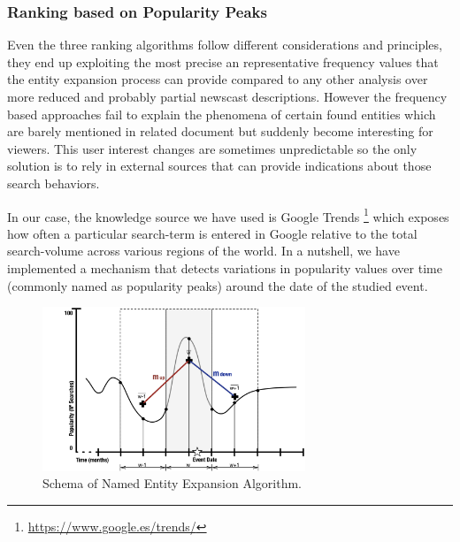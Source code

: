 \documentclass{llncs}
\begin{document}
\subsubsection{Ranking based on Popularity Peaks}

Even the three ranking algorithms follow different considerations and principles, they end up exploiting the most precise an representative frequency values that the entity expansion process can provide compared to any other analysis over more reduced and probably partial newscast descriptions. However the frequency based approaches fail to explain the phenomena of certain found entities which are barely mentioned in related document but suddenly become interesting for viewers. This user interest changes are sometimes unpredictable so the only solution is to rely in external sources that can provide indications about those search behaviors.

In our case, the knowledge source we have used is Google Trends \footnote{\fontsize{8pt}{1em}\selectfont \url{https://www.google.es/trends/}} which exposes how often a particular search-term is entered in Google relative to the total search-volume across various regions of the world. In a nutshell, we have implemented a mechanism that detects variations in popularity values over time (commonly named as popularity peaks) around the date of the studied event.

\begin{figure}[h!]
\centering
\includegraphics[width=0.7\textwidth]{figure/PopularityMeasure}
\caption{Schema of Named Entity Expansion Algorithm.}
\label{fig:PopularityMeasure}%
\end{figure}
\end{document}

